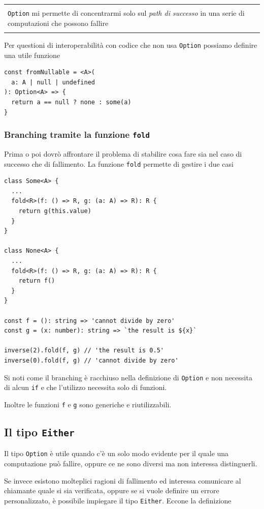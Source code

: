 \documentclass[12pt]{article}
\newenvironment{boxed}
    {\begin{center}
    \begin{tabular}{|p{0.9\textwidth}|}
    \hline\\
    }
    {
    \\\\\hline
    \end{tabular}
    \end{center}
    }
\begin{document}
\begin{boxed}
\texttt{Option} mi permette di concentrarmi solo sul \emph{path di successo} in una serie di computazioni che possono fallire
\end{boxed}

Per questioni di interoperabilità con codice che non usa \texttt{Option} possiamo definire una utile funzione

\begin{verbatim}
const fromNullable = <A>(
  a: A | null | undefined
): Option<A> => {
  return a == null ? none : some(a)
}
\end{verbatim}

\subsubsection{Branching tramite la funzione \texttt{fold}}

Prima o poi dovrò affrontare il problema di stabilire cosa fare sia nel caso di successo che di fallimento.
La funzione \texttt{fold} permette di gestire i due casi

\begin{verbatim}
class Some<A> {
  ...
  fold<R>(f: () => R, g: (a: A) => R): R {
    return g(this.value)
  }
}

class None<A> {
  ...
  fold<R>(f: () => R, g: (a: A) => R): R {
    return f()
  }
}

const f = (): string => 'cannot divide by zero'
const g = (x: number): string => `the result is ${x}`

inverse(2).fold(f, g) // 'the result is 0.5'
inverse(0).fold(f, g) // 'cannot divide by zero'
\end{verbatim}

Si noti come il branching è racchiuso nella definizione di \texttt{Option} e non necessita di alcun \texttt{if}
e che l'utilizzo necessita solo di funzioni.

Inoltre le funzioni \texttt{f} e \texttt{g} sono generiche e riutilizzabili.

\subsection{Il tipo \texttt{Either}}

Il tipo \texttt{Option} è utile quando c'è un solo modo evidente per il quale una computazione può fallire,
oppure ce ne sono diversi ma non interessa distinguerli.

Se invece esistono molteplici ragioni di fallimento ed interessa comunicare al chiamante quale si sia verificata,
oppure se si vuole definire un errore personalizzato, è possibile impiegare il tipo \texttt{Either}. Eccone la definizione
\end{document}
